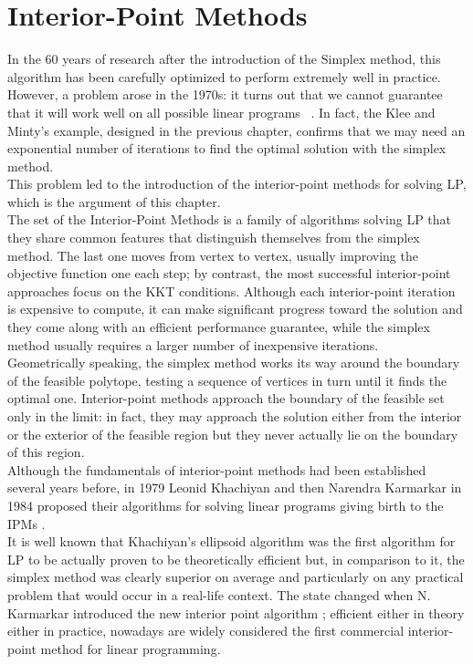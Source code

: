 \documentclass[a4paper,10 pt,titlepage,twoside]{report}
\theoremstyle{plain}
\theoremstyle{definition}
\theoremstyle{remark}
\begin{document}
\chapter{Interior-Point Methods}
In the 60 years of research after the introduction of the Simplex method, this algorithm has been carefully optimized to perform extremely well in practice. However, a problem arose in the 1970s: it turns out that we cannot guarantee that it will work well on all possible linear programs ~\cite{MINTY}.
In fact, the Klee and Minty's example, designed in the previous chapter, confirms that we may need an exponential number of iterations to find the optimal solution with the simplex method. \\
This problem led to the introduction of the interior-point methods for solving LP, which is the argument of this chapter.\\
The set of the Interior-Point Methods is a family of algorithms solving LP that they share common features that distinguish themselves from the simplex method. The last one moves from vertex to vertex, usually improving the objective function
one each step; by contrast, the most successful interior-point approaches focus on the KKT conditions. Although each interior-point iteration is expensive to compute, it can make significant progress toward the solution and they come along with an efficient performance guarantee, while the simplex method usually requires a larger number of inexpensive iterations.\\
Geometrically speaking, the simplex method works its way around
the boundary of the feasible polytope, testing a sequence of vertices in turn until it finds the
optimal one. Interior-point methods approach the boundary of the feasible set only in the
limit: in fact, they may approach the solution either from the interior or the exterior of the feasible
region but they never actually lie on the boundary of this region.\\
Although the fundamentals of interior-point methods had been established several years
before, in 1979 Leonid Khachiyan and then Narendra Karmarkar in 1984 proposed their algorithms for solving linear programs giving birth to the IPMs \cite{WWW}. \\It is well known that Khachiyan’s ellipsoid algorithm was the first algorithm for LP to be actually proven to
be theoretically efficient but, in comparison to it, the simplex method was clearly superior on average and particularly on any practical
problem that would occur in a real-life context. The state changed when N. Karmarkar introduced the new interior point algorithm \cite{Kar}; efficient either in theory either in practice, nowadays are widely considered the first commercial interior-point
method for linear programming.\\
\end{document}
